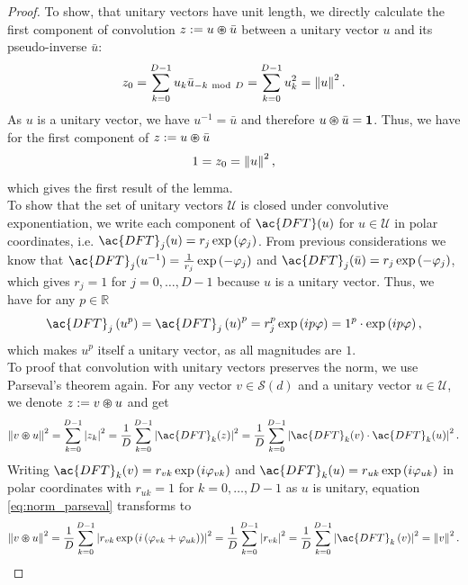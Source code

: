 \begin{proof}
	To show, that unitary vectors have unit length, we directly calculate the first component of convolution $z :=u \varoast \bar{u}$ between a unitary vector $u$ and its pseudo-inverse $\bar{u}$:
	\[
	z_{0} = \sum_{k=0}^{D-1} u_{k} \bar{u}_{-k \ \mathrm{mod}\ D} = \sum_{k=0}^{D-1} u_{k}^{2} = \left\| u \right\|^{2}.
	\]
	As $u$ is a unitary vector, we have $u^{-1} = \bar{u}$ and therefore $u\varoast \bar{u} = \mathbf{1}$.
	Thus, we have for the first component of $z :=u \varoast \bar{u}$
	\[
	1 = z_{0} = \left\| u \right\|^{2},
	\]
	which gives the first result of the lemma.\\
	To show that the set of unitary vectors $\mathcal{U}$ is closed under convolutive exponentiation, we write each component of $\ac{DFT}(u)$ for $u \in \mathcal{U}$ in polar coordinates, i.e. $\ac{DFT}_j(u) = r_j\exp\left(\varphi_j\right)$.
	From previous considerations we know that $\ac{DFT}_j(u^{-1}) = \frac{1}{r_j}\exp\left(-\varphi_j\right)$ and $\ac{DFT}_j(\bar{u}) = r_j\exp\left(-\varphi_j\right)$, which gives $r_j=1$ for $j=0, \ldots, D-1$ because $u$ is a unitary vector.
	Thus, we have for any $p \in \mathbb{R}$
	\[
	\ac{DFT}_j\left(u^{p}\right) = \ac{DFT}_j\left(u\right)^{p} = r_j^{p}\exp\left(ip\varphi\right) = 1^{p} \cdot \exp\left(ip\varphi\right),
	\]
	which makes $u^{p}$ itself a unitary vector, as all magnitudes are $1$.	\\
	To proof that convolution with unitary vectors preserves the norm, we use Parseval's theorem again.
	For any vector $v \in \mathcal{S}(d)$ and  a unitary vector $u \in \mathcal{U}$, we denote $z:= v \varoast u$ and get
	\begin{equation}
	\label{eq:norm_parseval}
	\norm{v \varoast u}^{2} = \sum_{k=0}^{D-1} \left|z_{k}\right|^{2} = \frac{1}{D} \sum_{k=0}^{D-1} \left|\ac{DFT}_{k}(z)\right|^{2} = \frac{1}{D} \sum_{k=0}^{D-1} \left|\ac{DFT}_{k}(v) \cdot \ac{DFT}_{k}(u)\right|^{2}.
	\end{equation}
	Writing $\ac{DFT}_{k}(v) = r_{vk}\exp\left(i\varphi_{vk}\right)$ and $\ac{DFT}_{k}(u) = r_{uk}\exp\left(i\varphi_{uk}\right)$ in polar coordinates with $r_{uk} = 1$ for $k=0, \ldots, D-1$ as $u$ is unitary, equation \ref{eq:norm_parseval} transforms to
	\begin{equation*}
	\norm{v \varoast u}^{2} = \frac{1}{D} \sum_{k=0}^{D-1} \left|r_{vk} \exp\left(i\left(\varphi_{vk} + \varphi_{uk}\right)\right)\right|^{2} = \frac{1}{D} \sum_{k=0}^{D-1} \left|r_{vk}\right|^{2} = \frac{1}{D} \sum_{k=0}^{D-1} \left|\ac{DFT}_k\left(v\right)\right|^{2} = \norm{v}^{2}.
	\end{equation*}
\end{proof}

